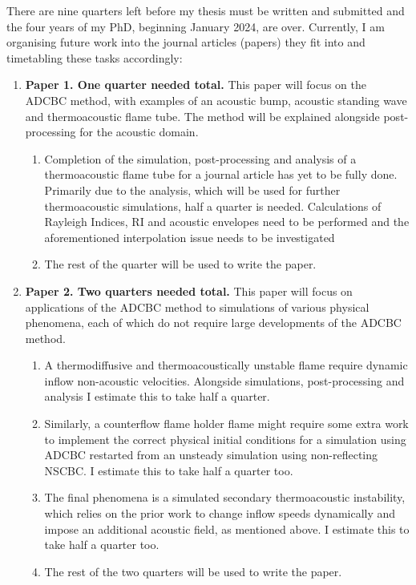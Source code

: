 There are nine quarters left before my thesis must be written and submitted and the four years of my PhD, beginning January 2024, are over. Currently, I am organising future work into the journal articles (papers) they fit into and timetabling these tasks accordingly:
\begin{enumerate}
\item \textbf{Paper 1. One quarter needed total.} This paper will focus on the ADCBC method, with examples of an acoustic bump, acoustic standing wave and thermoacoustic flame tube. The method will be explained alongside post-processing for the acoustic domain.
    \begin{enumerate}
    \item Completion of the simulation, post-processing and analysis of a thermoacoustic flame tube for a journal article has yet to be fully done. Primarily due to the analysis, which will be used for further thermoacoustic simulations, half a quarter is needed. Calculations of Rayleigh Indices, RI and acoustic envelopes need to be performed and the aforementioned interpolation issue needs to be investigated
    \item The rest of the quarter will be used to write the paper.
    \end{enumerate}
\item \textbf{Paper 2. Two quarters needed total.} This paper will focus on applications of the ADCBC method to simulations of various physical phenomena, each of which do not require large developments of the ADCBC method.
    \begin{enumerate}
    \item A thermodiffusive and thermoacoustically unstable flame require dynamic inflow non-acoustic velocities. Alongside simulations, post-processing and analysis I estimate this to take half a quarter.
    \item Similarly, a counterflow flame holder flame might require some extra work to implement the correct physical initial conditions for a simulation using ADCBC restarted from an unsteady simulation using non-reflecting NSCBC. I estimate this to take half a quarter too.
    \item The final phenomena is a simulated secondary thermoacoustic instability, which relies on the prior work to change inflow speeds dynamically and impose an additional acoustic field, as mentioned above. I estimate this to take half a quarter too.
    \item The rest of the two quarters will be used to write the paper.

\end{enumerate}
\end{enumerate}
